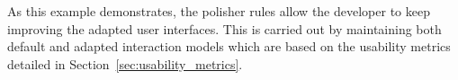 As this example demonstrates, the polisher rules allow the developer to keep
improving the adapted user interfaces. This is carried out by maintaining both
default and adapted interaction models which are based on the usability metrics
detailed in Section~\ref{sec:usability_metrics}.

% 
